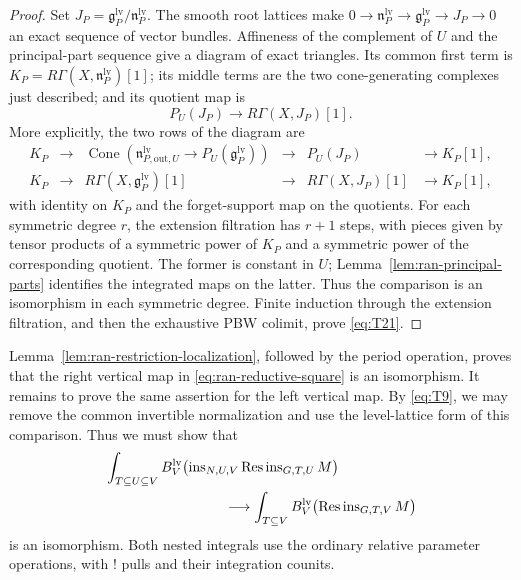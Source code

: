 \begin{proof}
Set $J_P=\mathfrak g^{\mathrm{lv}}_P/\mathfrak n^{\mathrm{lv}}_P$.
The smooth root lattices make
$0\to\mathfrak n^{\mathrm{lv}}_P\to
\mathfrak g^{\mathrm{lv}}_P\to J_P\to0$ an exact sequence of vector
bundles.  Affineness of the complement of $U$ and the principal-part
sequence give a diagram of exact triangles.  Its common first term is
$K_P=R\Gamma(X,\mathfrak n^{\mathrm{lv}}_P)[1]$; its middle terms are the
two cone-generating complexes just described; and its quotient map is
\[
        P_U(J_P)\longrightarrow R\Gamma(X,J_P)[1].
\]
More explicitly, the two rows of the diagram are
\[
\begin{array}{cccccc}
 K_P&\longrightarrow&
 \operatorname{Cone}(\mathfrak n^{\mathrm{lv}}_{P,\mathrm{out},U}
                  \to P_U(\mathfrak g^{\mathrm{lv}}_P))
 &\longrightarrow&P_U(J_P)&\longrightarrow K_P[1],\\[2pt]
 K_P&\longrightarrow&R\Gamma(X,\mathfrak g^{\mathrm{lv}}_P)[1]
 &\longrightarrow&R\Gamma(X,J_P)[1]&\longrightarrow K_P[1],
\end{array}
\]
with identity on $K_P$ and the forget-support map on the quotients.
For each symmetric degree $r$, the extension filtration has $r+1$ steps,
with pieces given by tensor products of a symmetric power of $K_P$ and a
symmetric power of the corresponding quotient.  The former is constant
in $U$; Lemma~\ref{lem:ran-principal-parts} identifies the integrated maps
on the latter.  Thus the comparison is an isomorphism in each symmetric
degree.  Finite induction through the extension filtration, and then the
exhaustive PBW colimit, prove \eqref{eq:T21}.
\end{proof}

Lemma~\ref{lem:ran-restriction-localization}, followed by the period
operation, proves that the right vertical map in
\eqref{eq:ran-reductive-square} is an isomorphism.  It remains to prove
the same assertion for the left vertical map.  By \eqref{eq:T9}, we may
remove the common invertible normalization and use the level-lattice
form of this comparison.  Thus we must show that
\begin{equation}\label{eq:T23}
\begin{aligned}
 &\int_{T\subseteq U\subseteq V}
 B_V^{\mathrm{lv}}\bigl(
    \operatorname{ins}_{N,U,V}\operatorname{Res}
                    \operatorname{ins}_{G,T,U}M\bigr)\\
 &\hspace{30mm}\longrightarrow
 \int_{T\subseteq V}B_V^{\mathrm{lv}}\bigl(
                 \operatorname{Res}\operatorname{ins}_{G,T,V}M\bigr)
\end{aligned}
\end{equation}
is an isomorphism.  Both nested integrals use the ordinary relative
parameter operations, with ! pulls and their integration counits.

